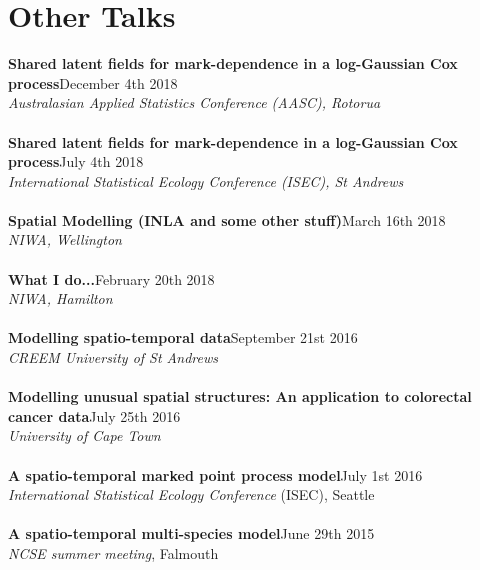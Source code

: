 \documentclass[10pt,letter]{article}
\begin{document}

\section*{Other Talks}
\vspace{1mm}
{\textbf{Shared latent fields for mark-dependence in a log-Gaussian Cox process}}\hfill December 4th 2018\\
 {\sl Australasian Applied Statistics Conference (AASC), Rotorua}\\
\hdashrule[0.5ex]{4cm}{1pt}{1pt}\\
{\textbf{Shared latent fields for mark-dependence in a log-Gaussian Cox process}}\hfill July 4th 2018\\
 {\sl International Statistical Ecology Conference (ISEC), St Andrews}\\
\hdashrule[0.5ex]{4cm}{1pt}{1pt}\\
{\textbf{Spatial Modelling (INLA and some other stuff)}}\hfill March 16th 2018\\
 {\sl NIWA, Wellington}\\
\hdashrule[0.5ex]{4cm}{1pt}{1pt}\\
{\textbf{What I do...}}\hfill February 20th 2018\\
 {\sl NIWA, Hamilton}\\
\hdashrule[0.5ex]{4cm}{1pt}{1pt}\\
{\textbf{Modelling spatio-temporal data}}\hfill September 21st 2016\\
 {\sl CREEM University of St Andrews}\\
\hdashrule[0.5ex]{4cm}{1pt}{1pt}\\
{\textbf{Modelling unusual spatial structures: An application to colorectal cancer data}}\hfill July 25th 2016\\
 {\sl University of Cape Town}\\
\hdashrule[0.5ex]{4cm}{1pt}{1pt}\\
{\textbf{A spatio-temporal marked point process model}}\hfill July 1st 2016\\
 {\sl International Statistical Ecology Conference} (ISEC), Seattle\\
 \hdashrule[0.5ex]{4cm}{1pt}{1pt}\\
 {\textbf{A spatio-temporal multi-species model}}\hfill June 29th 2015\\
 {\sl NCSE summer meeting}, Falmouth\\
\end{document}
